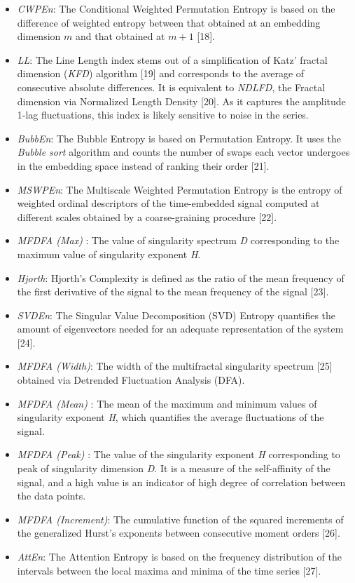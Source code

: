 \documentclass[
  man]{apa6}
\providecommand{\tightlist}{%
  \setlength{\itemsep}{0pt}\setlength{\parskip}{0pt}}
\begin{document}
\begin{itemize}
\tightlist
\item
  \emph{CWPEn}: The Conditional Weighted Permutation Entropy is based on the difference of weighted entropy between that obtained at an embedding dimension \(m\) and that obtained at \(m+1\) {[}18{]}.
\item
  \emph{LL}: The Line Length index stems out of a simplification of Katz' fractal dimension (\emph{KFD}) algorithm {[}19{]} and corresponds to the average of consecutive absolute differences. It is equivalent to \emph{NDLFD}, the Fractal dimension via Normalized Length Density {[}20{]}. As it captures the amplitude 1-lag fluctuations, this index is likely sensitive to noise in the series.
\item
  \emph{BubbEn}: The Bubble Entropy is based on Permutation Entropy. It uses the \emph{Bubble sort} algorithm and counts the number of swaps each vector undergoes in the embedding space instead of ranking their order {[}21{]}.
\item
  \emph{MSWPEn}: The Multiscale Weighted Permutation Entropy is the entropy of weighted ordinal descriptors of the time-embedded signal computed at different scales obtained by a coarse-graining procedure {[}22{]}.
\item
  \emph{MFDFA (Max)} : The value of singularity spectrum \emph{D} corresponding to the maximum value of singularity exponent \emph{H}.
\item
  \emph{Hjorth}: Hjorth's Complexity is defined as the ratio of the mean frequency of the first derivative of the signal to the mean frequency of the signal {[}23{]}.
\item
  \emph{SVDEn}: The Singular Value Decomposition (SVD) Entropy quantifies the amount of eigenvectors needed for an adequate representation of the system {[}24{]}.
\item
  \emph{MFDFA (Width)}: The width of the multifractal singularity spectrum {[}25{]} obtained via Detrended Fluctuation Analysis (DFA).
\item
  \emph{MFDFA (Mean)} : The mean of the maximum and minimum values of singularity exponent \emph{H}, which quantifies the average fluctuations of the signal.
\item
  \emph{MFDFA (Peak)} : The value of the singularity exponent \emph{H} corresponding to peak of singularity dimension \emph{D}. It is a measure of the self-affinity of the signal, and a high value is an indicator of high degree of correlation between the data points.
\item
  \emph{MFDFA (Increment)}: The cumulative function of the squared increments of the generalized Hurst's exponents between consecutive moment orders {[}26{]}.
\item
  \emph{AttEn}: The Attention Entropy is based on the frequency distribution of the intervals between the local maxima and minima of the time series {[}27{]}.
\end{itemize}
\end{document}
